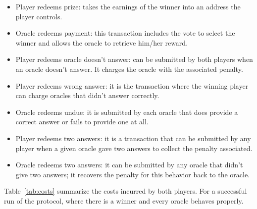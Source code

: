 \newcommand\totalcost[2]{\totalcostimpl{#1}{#2}{\numoracles{}}{\feeval{}}}%
\newcommand\totalcostsingle[2]{\totalcostimplsingle{#1}{#2}{\numoracles{}}{\feeval{}}}%

\begin{itemize}
    \item Player redeems prize: takes the earnings of the winner into an address
        the player controls.
    \item Oracle redeems payment: this transaction includes the vote to select
        the winner and allows the oracle to retrieve him/her reward.
    \item Player redeems oracle doesn't answer: can be submitted by both players
        when an oracle doesn't answer. It charges the oracle with the associated
        penalty.
    \item Player redeems wrong answer: it is the transaction where the winning
        player can charge oracles that didn't answer correctly.
    \item Oracle redeems undue: it is submitted by each oracle that does provide
        a correct answer or fails to provide one at all.
    \item Player redeems two answers: it is a transaction that can be submitted
        by any player when a given oracle gave two answers to collect the
        penalty associated.
    \item Oracle redeems two answers: it can be submitted by any oracle that
        didn't give two answers; it recovers the penalty for this behavior back
        to the oracle.
\end{itemize}

Table~\ref{tab:costs} summarize the costs incurred by both players.
For a successful run of the  protocol, where there is a winner and every oracle
  behaves properly.

